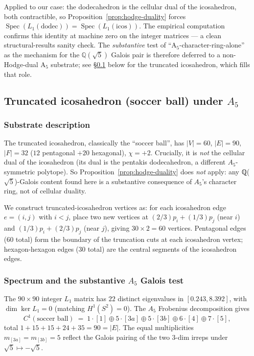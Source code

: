 \documentclass[12pt,a4paper]{article}
\theoremstyle{definition}
\theoremstyle{remark}
\newcommand{\bQ}{\mathbb{Q}}                %
\DeclareMathOperator{\Spec}{Spec}
\begin{document}
Applied to our case: the dodecahedron is the cellular dual of the
icosahedron, both contractible, so Proposition~\ref{prop:hodge-duality}
forces $\Spec(L_1(\text{dodec})) = \Spec(L_1(\text{icos}))$. The
empirical computation confirms this identity at machine zero on the
integer matrices --- a clean structural-results sanity check. The
\emph{substantive} test of ``A$_5$-character-ring-alone'' as the
mechanism for the $\bQ(\sqrt 5)$ Galois pair is therefore deferred to
a non-Hodge-dual A$_5$ substrate; see \S\ref{sec:soccerball} below for
the truncated icosahedron, which fills that role.

\subsection{Truncated icosahedron (soccer ball) under $A_5$}\label{sec:soccerball}

\subsubsection{Substrate description}\label{sec:soccer-description}

The truncated icosahedron, classically the ``soccer ball'', has
$|V| = 60$, $|E| = 90$, $|F| = 32$ ($12$ pentagonal $+ 20$ hexagonal),
$\chi = +2$. Crucially, it is \emph{not} the
cellular dual of the icosahedron (its dual is the pentakis
dodecahedron, a different $A_5$-symmetric polytope). So
Proposition~\ref{prop:hodge-duality} does \emph{not} apply: any
ℚ($\sqrt 5$)-Galois content found here is a substantive consequence
of $A_5$'s character ring, not of cellular duality.

We construct truncated-icosahedron vertices as: for each icosahedron
edge $e = (i, j)$ with $i < j$, place two new vertices at
$(2/3) p_i + (1/3) p_j$ (near $i$) and $(1/3) p_i + (2/3) p_j$
(near $j$), giving $30 \times 2 = 60$ vertices. Pentagonal edges
($60$ total) form the boundary of the truncation cuts at each
icosahedron vertex; hexagon-hexagon edges ($30$ total) are the
central segments of the icosahedron edges.

\subsubsection{Spectrum and the substantive $A_5$ Galois test}\label{sec:soccer-spectrum}

The $90 \times 90$ integer $L_1$ matrix has $22$ distinct eigenvalues
in $[0.243, 8.392]$, with $\dim \ker L_1 = 0$ (matching
$H^1(S^2) = 0$). The $A_5$ Frobenius decomposition gives
\[
  C^1(\text{soccer ball}) \;=\; 1 \cdot [1] \oplus 5 \cdot [3a]
  \oplus 5 \cdot [3b] \oplus 6 \cdot [4] \oplus 7 \cdot [5],
\]
total $1 + 15 + 15 + 24 + 35 = 90 = |E|$. The equal multiplicities
$m_{[3a]} = m_{[3b]} = 5$ reflect the Galois pairing of the two
$3$-dim irreps under $\sqrt 5 \mapsto -\sqrt 5$.
\end{document}
